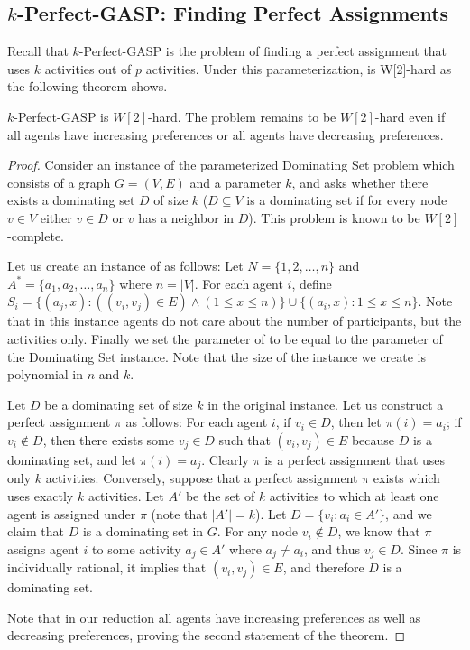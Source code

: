 \subsection{$k$-Perfect-GASP: Finding Perfect Assignments}
Recall that $k$-Perfect-GASP is the problem of finding a perfect assignment that uses $k$ activities out of $p$ activities. 
Under this parameterization, \GASPs is W[2]-hard as the following theorem shows. 

\begin{theorem} \label{GASP:thm:perfect_gasp_w2_hard}
	$k$-Perfect-GASP is $W[2]$-hard. The problem remains to be $W[2]$-hard even if all agents have increasing preferences or all agents have decreasing preferences. 
\end{theorem}
\begin{proof}
	Consider an instance of the parameterized Dominating Set problem which consists of a graph $G = (V, E)$ and a parameter $k$, and asks whether there exists a dominating set $D$ of size $k$ ($D \subseteq V$ is a dominating set if for every node $v\in V$ either $v \in D$ or $v$ has a neighbor in $D$). This problem is known to be $W[2]$-complete. 
	
	Let us create an instance of \GASPs as follows: Let $N = \{1, 2, \dots, n\}$ and $A^* = \{a_1, a_2, \dots, a_n\}$ where $n = |V|$. For each agent $i$, define $S_i = \{(a_j, x) : ((v_i, v_j) \in E) \land (1 \leq x \leq n) \} \cup \{(a_i, x) : 1 \leq x \leq n\}$. Note that in this instance agents do not care about the number of participants, but the activities only. Finally we set the parameter of \GASPs to be equal to the parameter of the Dominating Set instance. Note that the size of the \GASPs instance we create is polynomial in $n$ and $k$. 

	Let $D$ be a dominating set of size $k$ in the original instance. 
	Let us construct a perfect assignment $\pi$ as follows: 
	For each agent $i$, if $v_i \in D$, then let $\pi(i) = a_i$; if $v_i \not\in D$, then there exists some $v_j \in D$ such that $(v_i, v_j) \in E$ because $D$ is a dominating set, and let $\pi(i) = a_j$. Clearly $\pi$ is a perfect assignment that uses only $k$ activities.
	Conversely, suppose that a perfect assignment $\pi$ exists which uses exactly $k$ activities. Let $A'$ be the set of $k$ activities to which at least one agent is assigned under $\pi$ (note that $|A'| = k$). Let $D = \{v_i : a_i \in A'\}$, and we claim that $D$ is a dominating set in $G$. For any node $v_i \not\in D$, we know that $\pi$ assigns agent $i$ to some activity $a_j \in A'$ where $a_j \neq a_i$, and thus $v_j \in D$. Since $\pi$ is individually rational, it implies that $(v_i, v_j)\in E$, and therefore $D$ is a dominating set. 
	
	Note that in our reduction all agents have increasing preferences as well as decreasing preferences, proving the second statement of the theorem. 
\end{proof}

